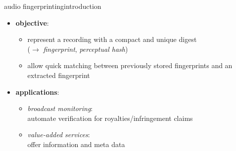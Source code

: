         \begin{frame}{audio fingerprinting}{introduction}
            \begin{itemize}
                \item	\textbf{objective}: 
                    \begin{itemize}
                        \item   represent a recording with a compact and unique digest\\ ($\rightarrow$ \textit{fingerprint}, \textit{perceptual hash})
                        
                        \bigskip
                        \item<2->   allow quick matching between previously stored fingerprints and an extracted fingerprint
                    \end{itemize}
                \bigskip
                \item<3->	\textbf{applications}:
                    \begin{itemize}
                        \item	\textit{broadcast monitoring}:\\ automate verification for royalties/infringement claims
                        \item	\textit{value-added services}:\\ offer information and meta data
                    \end{itemize}
            \end{itemize}
        \end{frame}
        
